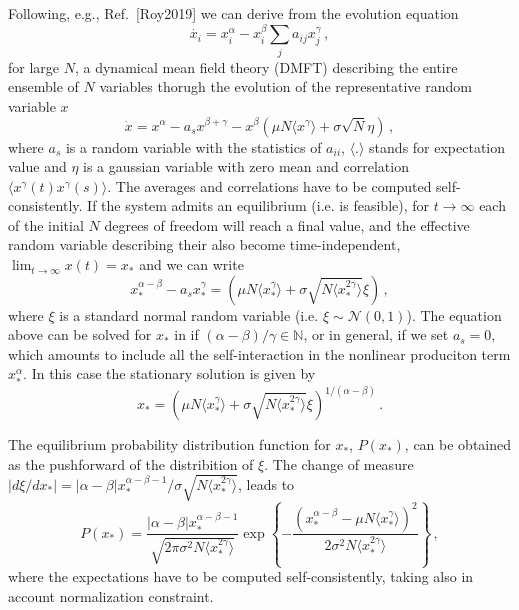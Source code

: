 \documentclass[%
 reprint,
 amsmath,amssymb,
 aps,
]{revtex4-2}
\begin{document}
Following, e.g., Ref.~[Roy2019] we can derive from 
the evolution equation
\begin{equation}
    \dot{x_i}=x_i^{\alpha} - x_i^{\beta}\sum_{j}a_{ij}x_j^{\gamma} \, ,
\label{eq: full abg}
\end{equation}
for large $N$, a dynamical mean field theory (DMFT) 
describing the entire ensemble of $N$ variables
thorugh the evolution of the representative random variable $x$
\begin{equation}
    \dot{x} = x^{\alpha}-a_sx^{\beta+\gamma}-x^{\beta}\left( \mu N \langle x^{\gamma}\rangle + \sigma \sqrt{N} \eta\right) \, ,
\label{eq: dmft}
\end{equation}
where $a_s$ is a random variable with the statistics of $a_{ii}$,
$\langle . \rangle$ stands for expectation value
and $\eta$ is a gaussian variable
with zero mean and correlation 
$\langle x^{\gamma}(t)x^{\gamma}(s)\rangle$. 
The averages and correlations have to be computed self-consistently.
If the system admits an equilibrium (i.e. is feasible), for 
$t\to\infty$ each of the initial $N$ degrees 
of freedom will reach a final value, 
and the effective random variable describing their
also become time-independent,
$\lim_{t\to\infty}x(t)=x_*$ and we can write
\begin{equation}
    x_*^{\alpha-\beta} - a_s x_*^{\gamma}= \left( \mu N \langle x_*^{\gamma}\rangle + \sigma \sqrt{N\langle x_*^{2\gamma}\rangle}\xi\right) \, ,
\end{equation} 
where $\xi$ is a standard normal random variable (i.e. $\xi\sim\mathcal{N}(0,1)$).
The equation above can be solved for $x_*$ in if $(\alpha-\beta)/\gamma\in\mathbb{N}$,
or in general, if we set $a_s=0$, which amounts to include
all the self-interaction in the nonlinear produciton term
$x_*^{\alpha}$.
In this case the stationary solution is given by 
\begin{equation}
    x_* = \left( \mu N \langle x_*^{\gamma}\rangle + \sigma \sqrt{N\langle x_*^{2\gamma}\rangle}\xi\right)^{1/(\alpha-\beta)} \, .
\end{equation}

The equilibrium probability distribution function for $x_*$, $P(x_*)$,
can be obtained as the pushforward of the distribition of $\xi$.
The change of measure
$\left|d \xi/d x_*\right|=|\alpha-\beta|x_*^{\alpha-\beta-1}/\sigma \sqrt{N\langle x_*^{2\gamma}\rangle}$,
leads to
\begin{equation}\label{eq: dist general}
    P(x_*)=\frac{|\alpha-\beta|x_*^{\alpha-\beta-1}}{\sqrt{2\pi\sigma^2 N\langle x_*^{2\gamma}\rangle}}
    \exp{\left\{-\frac{(x_*^{\alpha-\beta}-\mu N\langle x_*^{\gamma}\rangle)^2}{2\sigma^2N\langle x_*^{2\gamma}\rangle}\right\}} \, ,
\end{equation}
where the expectations have to be computed self-consistently, 
taking also in account normalization constraint.
\end{document}
